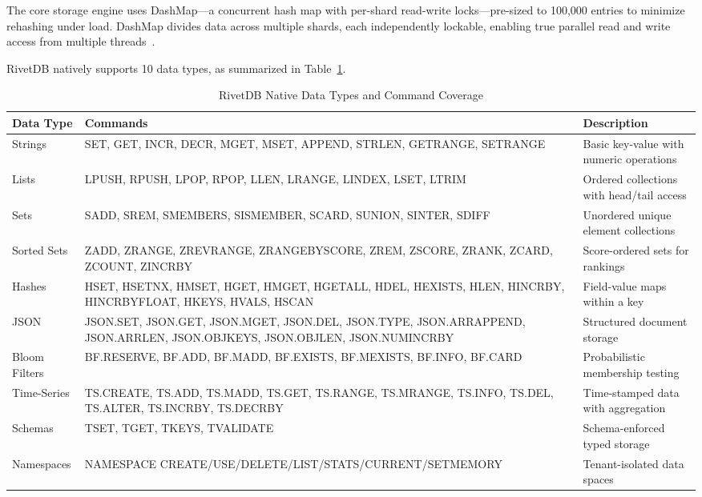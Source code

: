 \documentclass[conference,a4paper]{IEEEtran}
\begin{document}
The core storage engine uses DashMap---a concurrent hash map with per-shard read-write locks---pre-sized to 100,000 entries to minimize rehashing under load. DashMap divides data across multiple shards, each independently lockable, enabling true parallel read and write access from multiple threads~\cite{graefe2016, petrank2014}.

RivetDB natively supports 10 data types, as summarized in Table~\ref{tab:datatypes}.

\begin{table}[htbp]
\caption{RivetDB Native Data Types and Command Coverage}
\label{tab:datatypes}
\centering
\begin{tabular}{@{}lp{8.5cm}p{6cm}@{}}
\toprule
\textbf{Data Type} & \textbf{Commands} & \textbf{Description} \\
\midrule
Strings & SET, GET, INCR, DECR, MGET, MSET, APPEND, STRLEN, GETRANGE, SETRANGE & Basic key-value with numeric operations \\
Lists & LPUSH, RPUSH, LPOP, RPOP, LLEN, LRANGE, LINDEX, LSET, LTRIM & Ordered collections with head/tail access \\
Sets & SADD, SREM, SMEMBERS, SISMEMBER, SCARD, SUNION, SINTER, SDIFF & Unordered unique element collections \\
Sorted Sets & ZADD, ZRANGE, ZREVRANGE, ZRANGEBYSCORE, ZREM, ZSCORE, ZRANK, ZCARD, ZCOUNT, ZINCRBY & Score-ordered sets for rankings \\
Hashes & HSET, HSETNX, HMSET, HGET, HMGET, HGETALL, HDEL, HEXISTS, HLEN, HINCRBY, HINCRBYFLOAT, HKEYS, HVALS, HSCAN & Field-value maps within a key \\
JSON & JSON.SET, JSON.GET, JSON.MGET, JSON.DEL, JSON.TYPE, JSON.ARRAPPEND, JSON.ARRLEN, JSON.OBJKEYS, JSON.OBJLEN, JSON.NUMINCRBY & Structured document storage \\
Bloom Filters & BF.RESERVE, BF.ADD, BF.MADD, BF.EXISTS, BF.MEXISTS, BF.INFO, BF.CARD & Probabilistic membership testing \\
Time-Series & TS.CREATE, TS.ADD, TS.MADD, TS.GET, TS.RANGE, TS.MRANGE, TS.INFO, TS.DEL, TS.ALTER, TS.INCRBY, TS.DECRBY & Time-stamped data with aggregation \\
Schemas & TSET, TGET, TKEYS, TVALIDATE & Schema-enforced typed storage \\
Namespaces & NAMESPACE CREATE/USE/DELETE/LIST/STATS/CURRENT/SETMEMORY & Tenant-isolated data spaces \\
\bottomrule
\end{tabular}
\end{table}
\end{document}
